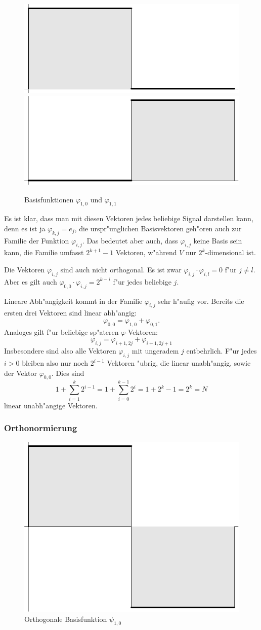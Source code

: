 \begin{figure}
\begin{center}
\includegraphics[width=0.45\hsize]{images/w-2}
\includegraphics[width=0.45\hsize]{images/w-3}
\end{center}
\caption{Basisfunktionen $\varphi_{1,0}$ und $\varphi_{1,1}$\label{wavelet-phi10-11}}
\end{figure}

Es ist klar, dass man mit diesen Vektoren jedes beliebige Signal
darstellen kann, denn es ist ja
$\varphi_{k,j}=e_j$, die urspr"unglichen Basisvektoren geh"oren 
auch zur Familie der Funktion $\varphi_{i,j}$. Das bedeutet
aber auch, dass $\varphi_{i,j}$ keine Basis sein kann, die Familie
umfasst $2^{k+1}-1$ Vektoren, w"ahrend $V$ nur $2^k$-dimensional ist.

Die Vektoren $\varphi_{i,j}$ sind auch nicht orthogonal. Es ist
zwar $\varphi_{i,j}\cdot\varphi_{i,l}=0$ f"ur $j\ne l$. Aber es
gilt auch $\varphi_{0,0}\cdot\varphi_{i,j}=2^{k-i}$ f"ur jedes
beliebige $j$.

Lineare Abh"angigkeit kommt in der Familie $\varphi_{i,j}$ sehr
h"aufig vor. Bereits die ersten drei Vektoren sind linear
abh"angig:
$$\varphi_{0,0}=\varphi_{1,0}+\varphi_{0,1}.$$
Analoges gilt f"ur beliebige sp"ateren $\varphi$-Vektoren:
$$
\varphi_{i,j}=\varphi_{i+1,2j}+\varphi_{i+1,2j+1}
$$
Insbesondere sind also alle Vektoren $\varphi_{i,j}$ mit 
ungeradem $j$ entbehrlich. F"ur jedes $i>0$ bleiben also
nur noch $2^{i-1}$ Vektoren "ubrig, die linear unabh"angig,
sowie der Vektor $\varphi_{0,0}$. Dies sind
$$
1+\sum_{i=1}^k 2^{i-1}=1+\sum_{i=0}^{k-1}2^i=1+2^{k}-1=2^{k}=N
$$
linear unabh"angige Vektoren.

\subsubsection{Orthonormierung}
\begin{figure}
\begin{center}
\includegraphics[width=0.45\hsize]{images/w-8}
\end{center}
\caption{Orthogonale Basisfunktion $\psi_{1,0}$\label{wavelet-psi10}}
\end{figure}

